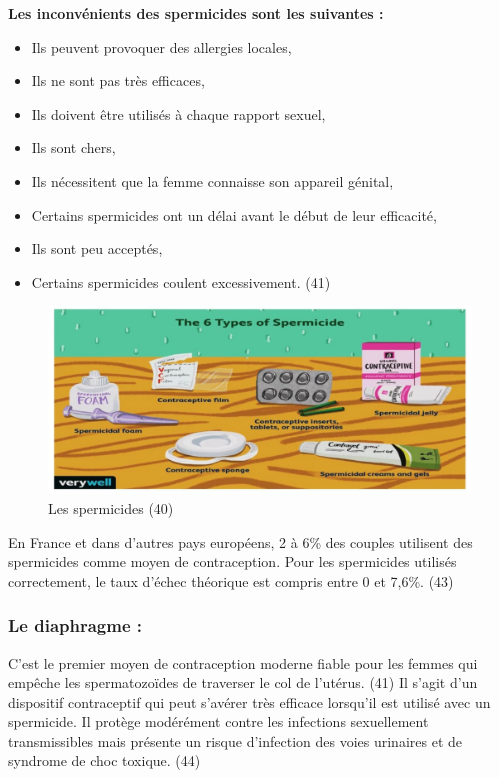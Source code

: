 \noindent \textbf{Les inconvénients des spermicides sont les suivantes :}

\begin{itemize}[label={$\bullet$}, align=right]
  \item Ils peuvent provoquer des allergies locales,  
  \item Ils ne sont pas très efficaces, 
  \item Ils doivent être utilisés à chaque rapport sexuel, 
  \item Ils sont chers,
  \item Ils nécessitent que la femme connaisse son appareil génital, 
  \item Certains spermicides ont un délai avant le début de leur efficacité,
  \item Ils sont peu acceptés, 
  \item Certains spermicides coulent excessivement. (41)
\end{itemize} \vspace*{1em}

\begin{figure}[H]
  \centering
  \includegraphics[scale=.4]{Images/fig_20.jpg}
  \caption{Les spermicides (40)}
\end{figure}

\noindent En France et dans d’autres pays européens, 2 à 6\% des couples utilisent des spermicides comme moyen de contraception. Pour les spermicides utilisés correctement, le taux d’échec théorique est compris entre 0 et 7,6\%. (43)  

\subsubsection{Le diaphragme :}
\noindent  C’est le premier moyen de contraception moderne fiable pour les femmes qui empêche les spermatozoïdes de traverser le col de l’utérus. (41)  Il s’agit d’un dispositif contraceptif qui peut s’avérer très efficace lorsqu’il est utilisé avec un spermicide. Il protège modérément contre les infections sexuellement transmissibles mais présente un risque d’infection des voies urinaires et de syndrome de choc toxique. (44) \\

